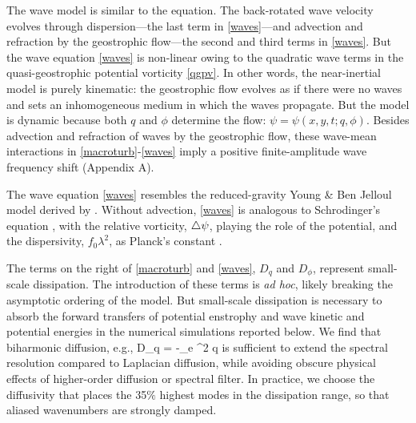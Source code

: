 \documentclass{jfm}
\begin{document}
The wave model is similar to the \cite{young_benjelloul1997} equation.
The back-rotated wave velocity
evolves through dispersion---the last term in \eqref{waves}---and
advection and refraction by the geostrophic flow---the second and third terms in
\eqref{waves}. But the wave equation \eqref{waves} is non-linear owing to the
quadratic wave terms in the quasi-geostrophic potential vorticity \eqref{qgpv}. In other
words, the
\cite{young_benjelloul1997} near-inertial model is purely kinematic: the geostrophic
flow evolves as if there were no waves and sets an
inhomogeneous medium in which the waves propagate.
But the \cite{xie_vanneste2015} model is dynamic because both $q$ and $\phi$
determine the flow: $\psi=\psi(x,y,t; q, \phi)$. Besides advection and refraction of waves
by the geostrophic flow, these wave-mean interactions in \eqref{macroturb}-\eqref{waves}
imply a positive finite-amplitude wave frequency shift (Appendix A).

The wave equation \eqref{waves} resembles the reduced-gravity
Young \& Ben Jelloul model derived by  \cite{danioux_etal2015}. Without advection,
\eqref{waves} is analogous to Schrodinger's equation
\citep[e.g.,][ pg. 51]{landau_lifshitz2013}, with the relative vorticity, $\triangle\psi$,
playing the role of the
potential, and the dispersivity, $f_0\lambda^2$, as Planck's constant
\citep{danioux_etal2015}.

The terms on the right of
\eqref{macroturb}  and \eqref{waves}, $D_q$ and $D_\phi$, represent small-scale dissipation. The
introduction of these terms is \textit{ad hoc}, likely breaking the asymptotic ordering of the \cite{xie_vanneste2015}
model. But small-scale dissipation is necessary to absorb the forward transfers
of potential enstrophy and wave kinetic and potential energies in the numerical
simulations reported below.
We find that biharmonic diffusion, e.g.,
\beq
D_q = -\kappa_e \lap^2 q\com
\eeq
is sufficient to extend the spectral resolution compared to Laplacian diffusion, while avoiding
obscure physical effects of higher-order diffusion or spectral
filter.
In practice, we choose the diffusivity that places the 35$\%$ highest
modes in the dissipation range, so that aliased wavenumbers are strongly damped.
\end{document}
